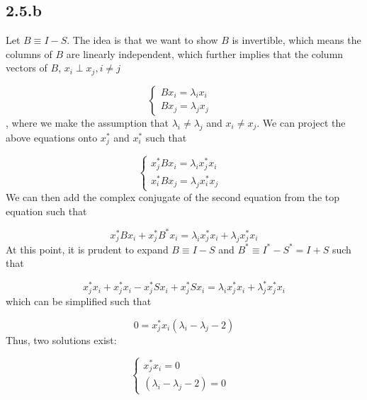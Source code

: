 \documentclass[a4paper,12pt]{article}
\begin{document}
\subsection{2.5.b}

Let $B \equiv I - S$. The idea is that we want to show $B$ is invertible, which means the columns of $B$ are linearly independent, which further implies that the column vectors of $B$, $x_i \perp x_j, i \neq j$


\begin{equation}
\left\{
	\begin{array}{ll}
		Bx_i = \lambda_i x_i  & \\
		Bx_j = \lambda_j x_j & 
	\end{array}
\right.
\end{equation}, where we make the assumption that $\lambda_i \neq \lambda_j$ and $x_i \neq x_j$. We can project the above equations onto $x_j^*$ and $x_i^*$ such that

\begin{equation}
\left\{
	\begin{array}{ll}
		x_j^* Bx_i = \lambda_i x_j^* x_i  & \\
		x_i^* Bx_j = \lambda_j x_i^* x_j & 
	\end{array}
\right.
\end{equation}
We can then add the complex conjugate of the second equation from the top equation such that

\begin{equation}
x_j^* Bx_i  + x_j^* B^*x_i  = \lambda_i x_j^* x_i  + \lambda_j x_j^* x_i
\end{equation} At this point, it is prudent to expand $B \equiv I - S$ and $B^* \equiv I^* - S^* = I+S$  such that

\begin{equation}
x_j^* x_i + x_j^* x_i - x_j^* S x_i + x_j^* S x_i = \lambda_i x_j^* x_i  + \lambda_j^* x_j^* x_i
\end{equation} 
which can be simplified such that



\begin{equation}
0 =x_j^* x_i ( \lambda_i  - \lambda_j  -2 ) 
\end{equation} Thus, two solutions exist:

\begin{equation}
\left\{
	\begin{array}{ll}
		x_j^* x_i = 0  & \\
		( \lambda_i  - \lambda_j  -2 ) = 0& 
	\end{array}
\right.
\end{equation}
\end{document}
